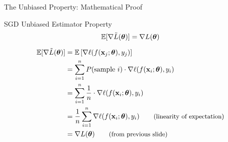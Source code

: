 \documentclass[usenames,dvipsnames]{beamer}
\newcommand{\E}{\mathbb{E}}
\begin{document}
  \begin{frame}{The Unbiased Property: Mathematical Proof}
    \begin{theorembox}{SGD Unbiased Estimator Property}
      {\small
    $$\E[\nabla \tilde{L}(\vtheta)] = \nabla L(\vtheta)$$
      }
    \end{theorembox}

    \pause
    {\small
    \begin{align}
    \E[\nabla \tilde{L}(\vtheta)] &= \E\left[\nabla \ell(f(\vx_j;\vtheta),y_j)\right]\\
    &= \sum_{i=1}^n P(\text{sample } i) \cdot \nabla \ell(f(\vx_i;\vtheta),y_i)\\
    &= \sum_{i=1}^n \frac{1}{n} \cdot \nabla \ell(f(\vx_i;\vtheta),y_i)\\
    &= \frac{1}{n}\sum_{i=1}^n \nabla \ell(f(\vx_i;\vtheta),y_i) \qquad \text{\small (linearity of expectation)}\\
    &= \nabla L(\vtheta) \qquad \text{\small (from previous slide)}
    \end{align}
    }

  \end{frame}

    


\end{document}
